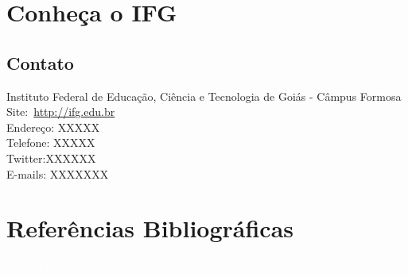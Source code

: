 \documentclass[11pt,fleqn]{book} %
\begin{document}
\chapter*{Conheça o IFG}
\vspace{6em}
\begin{flushright}
\end{flushright}
\vspace{12em}

\section{Contato}

Instituto Federal de Educação, Ciência e Tecnologia de Goiás - Câmpus Formosa\\
Site:~\url{http://ifg.edu.br}\\
Endereço: XXXXX\\
Telefone: XXXXX \\
Twitter:XXXXXX \\
E-mails: XXXXXXX


%

\chapter*{Referências Bibliográficas}
\vspace{6em}
\begin{flushright}
	\textit{\textcolor{white}{Foto: Adriano Darosci}}
\end{flushright}
\vspace{12em}
\printbibliography[heading=bibempty]
\end{document}
